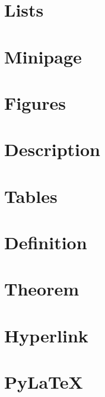 
\section{Lists}
    

\section{Minipage}
    

\section{Figures}
    

\section{Description}
    

\section{Tables}
    

\section{Definition}
    

\section{Theorem}
    

\section{Hyperlink}
    
    
\section{PyLaTeX}
    